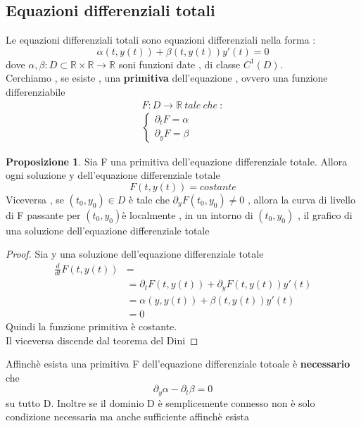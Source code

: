 \documentclass{article}
\theoremstyle{definition}
\newtheorem*{proposizione}{Proposizione}
\newcommand{\R}{\mathbb{R}}
\begin{document}
 	 	 	\subsection{Equazioni differenziali totali}
 	 	 	Le equazioni differenziali totali sono equazioni differenziali nella forma : $$\alpha(t,y(t))+\beta(t,y(t))y'(t)=0$$ 
 	 	 	dove $\alpha , \beta : D \subset \R \times \R \rightarrow \R$ soni funzioni date , di classe $C^1(D)$. \\ Cerchiamo , se esiste , una \textbf{primitiva} dell'equazione , ovvero una funzione differenziabile 
 	 	 	\begin{align*}
  	 	 		F:D \rightarrow \R \ tale\  che\ : \\
  	 	 		\begin{cases}
  	 	 			\partial_t F=\alpha \\
  	 	 			\partial_y F = \beta 
  	 	 		\end{cases}
 	 	 	\end{align*}
 	 	 	\begin{proposizione}
Sia F una primitiva dell'equazione differenziale totale. Allora ogni soluzione y dell'equazione differenziale totale $$F(t,y(t))=costante$$Viceversa , se $(t_0,y_0)\in D $ è tale che $\partial_y F(t_0,y_0)\neq 0 $ , allora la curva di livello di F passante per $(t_0,y_0)$è localmente , in un intorno di $(t_0,y_0)$ , il grafico di una soluzione dell'equazione differenziale totale 
\end{proposizione}
\begin{proof}
	Sia y una soluzione dell'equazione differenziale totale 
	\begin{align*}
		\frac{d}{dt}F(t,y(t))&=\\&=\partial_t F(t,y(t))+\partial_y F(t,y(t))y'(t) \\ &=\alpha(y,y(t))+\beta (t,y(t))y'(t)\\
		&=0
	\end{align*}
	Quindi la funzione primitiva è costante. \\
	Il viceversa discende dal teorema del Dini
\end{proof}
Affinchè esista una primitiva F dell'equazione differenziale totoale è \textbf{necessario} che 
$$\partial_y \alpha - \partial_t \beta =0 $$
su tutto D. Inoltre se il dominio D è semplicemente connesso non è solo condizione necessaria ma anche sufficiente affinchè esista 
\end{document}
